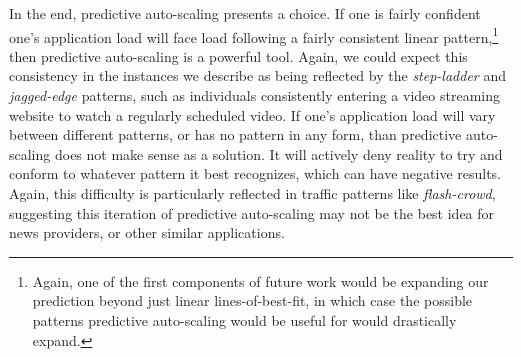 In the end, predictive auto-scaling presents a choice. If one is fairly
confident one's application load will face load following a fairly consistent
linear pattern,\footnote{Again, one of the first components of future work would
be expanding our prediction beyond just linear lines-of-best-fit, in which case
the possible patterns predictive auto-scaling would be useful for would
drastically expand.} then predictive auto-scaling is a powerful tool. Again, we
could expect this consistency in the instances we describe as being reflected by
the \textit{step-ladder} and \textit{jagged-edge} patterns, such as individuals
consistently entering a video streaming website to watch a regularly scheduled
video. If one's application load will vary between different patterns, or has no
pattern in any form, than predictive auto-scaling does not make sense as a
solution. It will actively deny reality to try and conform to whatever pattern
it best recognizes, which can have negative results. Again, this difficulty is
particularly reflected in traffic patterns like \textit{flash-crowd}, suggesting
this iteration of predictive auto-scaling may not be the best idea for news
providers, or other similar applications.

